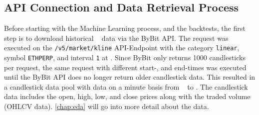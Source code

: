 \subsection{API Connection and Data Retrieval Process}
\label{chap:api-connection}

Before starting with the Machine Learning process, and the backtests, the first step is to download historical \ethusdc~ data via the ByBit API.
The request was executed on the \texttt{/v5/market/kline} API-Endpoint \cite{bybit-api-doc-get-kline} with the category \texttt{linear}, symbol \texttt{ETHPERP}, and interval \texttt{1} at \ethDataEndDate.
Since ByBit only returns 1000 candlesticks per request, the same request with different start-, and end-times was executed until the ByBit API does no longer return older candlestick data.
This resulted in a candlestick data pool with data on a minute basis from \ethDataStartDate~ to \ethDataEndDate.
The candlestick data includes the open, high, low, and close prices along with the traded volume (OHLCV data).
\autoref{chap:eda} will go into more detail about the data.


